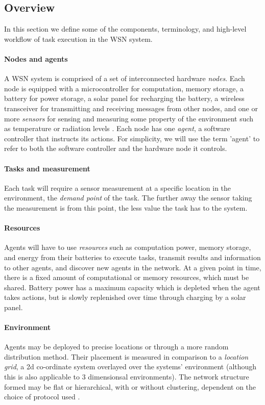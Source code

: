 \subsection{Overview}
\label{problem_overview}
In this section we define some of the components, terminology, and high-level workflow of task execution in the WSN system.

\paragraph{Nodes and agents}
A WSN system is comprised of a set of interconnected hardware \textit{nodes}. Each node is equipped with a microcontroller for computation, memory storage, a battery for power storage, a solar panel for recharging the battery, a wireless transceiver for  transmitting and receiving messages from other nodes, and one or more \textit{sensors} for sensing and measuring some property of the environment such as temperature or radiation levels \citep{muhammad_r_ahmed_2012_1072589}. Each node has one \textit{agent}, a software controller that instructs its actions. For simplicity, we will use the term 'agent' to refer to both the software controller and the hardware node it controls. 

\paragraph{Tasks and measurement}
Each task will require a sensor measurement at a specific location in the environment, the \textit{demand point} of the task. The further away the sensor taking the measurement is from this point, the less value the task has to the system.

\paragraph{Resources}
Agents will have to use \textit{resources} such as computation power, memory storage, and energy from their batteries to execute tasks, transmit results and information to other agents, and discover new agents in the network. At a given point in time, there is a fixed amount of computational or memory resources, which must be shared. Battery power has a maximum capacity which is depleted when the agent takes actions, but is slowly replenished over time through charging by a solar panel.  

\paragraph{Environment}
Agents may be deployed to precise locations or through a more random distribution method. Their placement is measured in comparison to a \textit{location grid}, a 2d co-ordinate system overlayed over the systems' environment (although this is also applicable to 3 dimensionsal environments).  The network structure formed may be flat or hierarchical, with or without clustering, dependent on the choice of protocol used \citep{Carlos-Mancilla2016b}. 

